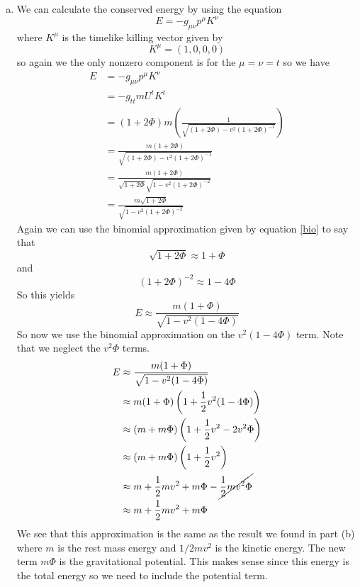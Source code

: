 \documentclass[11pt]{article}
\numberwithin{equation}{section}
\begin{document}
\begin{enumerate}[(a)]
\item
We can calculate the conserved energy by using the equation
\begin{equation}
E = - g_{\mu\nu}p^{\mu}K^{\nu}
\label{EnCon}
\end{equation}
where $K^{\mu}$ is the timelike killing vector given by
$$K^{\mu} = (1,0,0,0)$$
so again we the only nonzero component is for the $\mu=\nu=t$ so we have
\begin{align*}
E &= - g_{\mu\nu}p^{\mu}K^{\nu}\\
&= - g_{tt}mU^{t}K^{t}\\
&= (1+2\Phi)m\left(\frac{1}{\sqrt{(1+2\Phi) - v^2(1+2\Phi)^{-1}}}\right)\\
&= \frac{m(1+2\Phi)}{\sqrt{(1+2\Phi) - v^2(1+2\Phi)^{-1}}}\\
&= \frac{m(1+2\Phi)}{\sqrt{1+2\Phi}\sqrt{1 - v^2(1+2\Phi)^{-2}}}\\
&= \frac{m\sqrt{1+2\Phi}}{\sqrt{1 - v^2(1+2\Phi)^{-2}}}
\end{align*}
Again we can use the binomial approximation given by equation \ref{bio} to say that 
$$\sqrt{1+2\Phi} \approx 1+\Phi$$
and
$$(1+2\Phi)^{-2} \approx 1-4\Phi$$
So this yields 
$$E \approx \frac{m(1+\Phi)}{\sqrt{1 - v^2(1-4\Phi)}}$$
So now we use the binomial approximation on the $v^2(1-4\Phi)$ term. Note that we neglect the $v^2\Phi$ terms.
\begin{align*}
E &\approx \frac{m(1+\Phi)}{\sqrt{1 - v^2(1-4\Phi)}}\\
&\approx m(1+\Phi)\left(1 + \frac{1}{2}v^2(1-4\Phi)\right)\\
&\approx (m+m\Phi)\left(1 + \frac{1}{2}v^2-2v^2\Phi\right)\\
&\approx (m+m\Phi)\left(1 + \frac{1}{2}v^2\right)\\
&\approx m + \frac{1}{2}mv^2 + m\Phi - \cancel{\frac{1}{2}mv^2\Phi}\\
&\approx m + \frac{1}{2}mv^2 + m\Phi 
\end{align*}
We see that this approximation is the same as the result we found in part (b) where $m$ is the rest mass energy and $1/2mv^2$ is the kinetic energy. The new term $m\Phi$ is the gravitational potential. This makes sense since this energy is the total energy so we need to include the potential term.
\end{enumerate}
\end{document}

